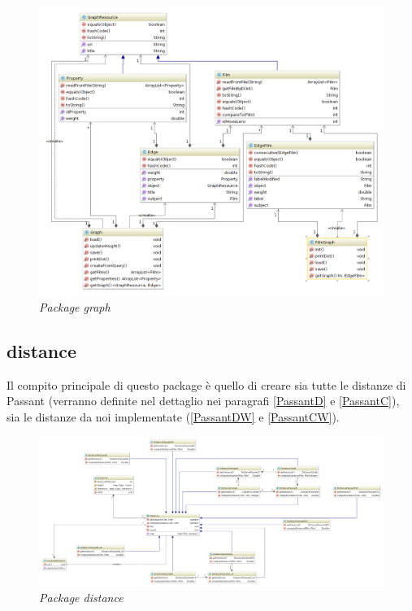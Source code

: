 \begin{figure}[H]
	\includegraphics[width=\textwidth]{./images/Diagrams/graph.png}
	\caption{\emph{Package graph}}
\end{figure}

\subsection{distance}
Il compito principale di questo package è quello di creare sia tutte le distanze di Passant (verranno definite nel dettaglio nei paragrafi \ref{PassantD} e \ref{PassantC}), sia le distanze da noi implementate (\ref{PassantDW} e \ref{PassantCW}).
\begin{figure}[H]
	\advance\leftskip-3cm
	\includegraphics[width=1.45\textwidth]{./images/Diagrams/distance.png}
	\caption{\emph{Package distance}}
\end{figure}

